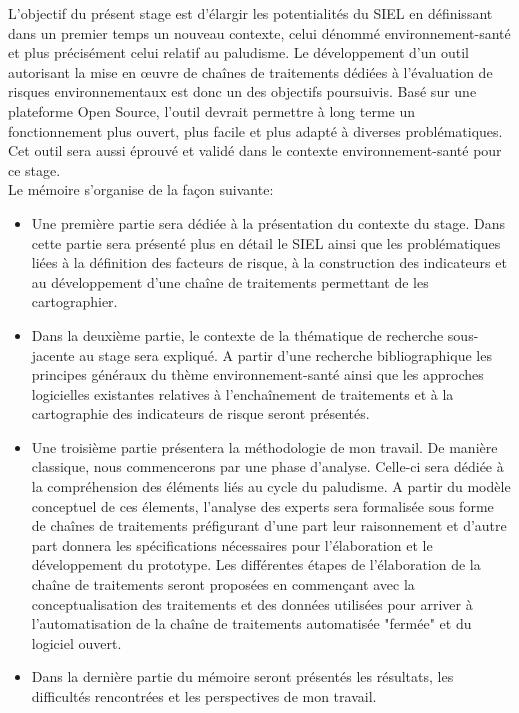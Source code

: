 L'objectif du présent stage est d'élargir les potentialités du SIEL en définissant dans un premier temps un nouveau contexte, celui dénommé environnement-santé et plus précisément celui relatif au paludisme. Le développement d'un outil autorisant la mise en \oe uvre de chaînes de traitements dédiées à l'évaluation de risques environnementaux est donc un des objectifs poursuivis. Basé sur une plateforme Open Source, l'outil devrait permettre à long terme un fonctionnement plus ouvert, plus facile et plus adapté à diverses problématiques. Cet outil sera aussi éprouvé et validé dans le contexte environnement-santé pour ce stage. \\


Le mémoire s'organise de la façon suivante:\newline

\begin{itemize}
\item Une première partie sera dédiée à la présentation du contexte du stage. Dans cette partie sera présenté plus en détail le SIEL ainsi que les problématiques liées à la définition des facteurs de risque, à la construction des indicateurs et au développement d'une chaîne de traitements permettant de les cartographier.\\

\item Dans la deuxième partie, le contexte de la thématique de recherche sous-jacente au stage sera expliqué. A partir d'une recherche bibliographique les principes généraux du thème  environnement-santé ainsi que les approches logicielles existantes relatives à l'enchaînement de traitements et à la cartographie des indicateurs de risque seront présentés.\\

\item Une troisième partie présentera la méthodologie de mon travail. De manière classique, nous commencerons par une phase d'analyse. Celle-ci sera dédiée à la compréhension des éléments liés au cycle du paludisme. A partir du modèle conceptuel de ces élements, l'analyse des experts sera formalisée sous forme de chaînes de traitements préfigurant d'une part leur raisonnement et d'autre part donnera les spécifications  nécessaires pour l'élaboration et le développement du prototype. Les différentes étapes de l'élaboration de la chaîne de traitements seront proposées en commençant avec la  conceptualisation des traitements et des données utilisées pour arriver à l'automatisation de la chaîne de traitements automatisée "fermée" et du logiciel ouvert.\\

\item Dans la dernière partie du mémoire seront présentés les résultats, les difficultés rencontrées et les perspectives de mon travail.\newline

\end{itemize}

